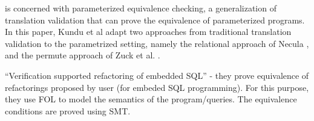\documentclass[runningheads,a4paper]{llncs}
\begin{document}






\cite{DBLP:conf/pldi/KunduTL09} is concerned with parameterized
equivalence checking, a generalization of translation validation that
can prove the equivalence of parameterized programs.  In this paper,
Kundu et al adapt two approaches from traditional translation
validation to the parametrized setting, namely the relational approach
of Necula \cite{DBLP:conf/pldi/Necula00}, and the permute approach of
Zuck et al. \cite{DBLP:journals/fmsd/ZuckPGBFH05}.





``Verification supported refactoring of embedded SQL'' - they prove
equivalence of refactorings proposed by user (for embeded SQL
programming). For this purpose, they use FOL to model the semantics of
the program/queries. The equivalence conditions are proved using SMT.
\end{document}
